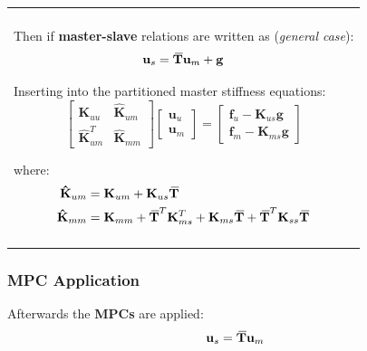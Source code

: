 \documentclass[10pt,b5paper,titlepage]{book}
\newcommand{\m}{\mathbf}
\newcommand{\closure}[2][3]{%
{}\mkern#1mu\overline{\mkern-#1mu#2}}
\newenvironment{bbox}[1][0.96]
{
    \begin{center}
        \begin{tabular}{|p{#1\textwidth}|}
            \hline\\
}
{
            \\\\\hline
        \end{tabular}
    \end{center}
}
\newenvironment{eqarray}
{
    \begin{eqnarray}
        \begin{aligned}
}
{
        \end{aligned}
    \end{eqnarray}
}
\begin{document}
\begin{bbox}

    Then if \textbf{master-slave} relations are written as (\textit{general case}):
    \begin{equation}
        \m{u}_s = \m{\closure{T}} \m{u}_m + \m{g}
    \end{equation}

    Inserting into the partitioned master stiffness equations:
    \begin{equation}
        \begin{bmatrix}
            \m{K}_{uu} & \m{\hat{K}}_{um} \\
            \m{\hat{K}}_{um}^T & \m{\hat{K}}_{mm}
        \end{bmatrix}
        \begin{bmatrix}
            \m{u}_u \\
            \m{u}_m
        \end{bmatrix}
        = \begin{bmatrix}
            \m{f}_u - \m{K}_{us} \m{g} \\
            \m{f}_m - \m{K}_{ms} \m{g}
        \end{bmatrix}
    \end{equation}

    where:
    \begin{eqarray}
        \m{\hat{K}}_{um} &= \m{K}_{um} + \m{K}_{us} \m{\closure{T}} \\
        \m{\hat{K}}_{mm} &= \m{K}_{mm} + \m{\closure{T}}^T \m{K}_{ms}^T
                            + \m{K}_{ms} \m{\closure{T}}
                            + \m{\closure{T}}^T \m{K}_{ss} \m{\closure{T}}
    \end{eqarray}

\end{bbox}


\subsubsection{MPC Application}

Afterwards the \textbf{MPCs} are applied:
\begin{equation}
    \m{u}_s = \m{\closure{T}} \m{u}_m
\end{equation}
\end{document}
